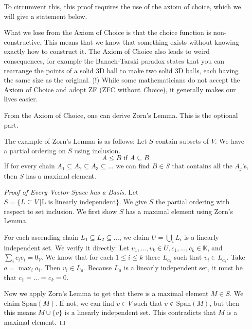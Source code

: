 To circumvent this, this proof requires the use of the axiom of choice, which we will give a statement below.
\begin{remark}
	What we lose from the Axiom of Choice is that the choice function is non-constructive. This means that we know that something exists without knowing
	exactly how to construct it. The Axiom of Choice also leads to weird consequences, for example the Banach-Tarski paradox states that you can
	rearrange the points of a solid 3D ball to make two solid 3D balls, each having the same size as the original. (!)
	While some mathematicians do not accept the Axiom of Choice and adopt ZF (ZFC without \textit{C}hoice), it generally makes our lives easier.
\end{remark}
From the Axiom of Choice, one can derive Zorn's Lemma. This is the optional part.
\begin{remark}
	The example of Zorn's Lemma is as follows:
	Let $S$ contain subsets of $V$. We have a partial ordering on $S$ using inclusion.\[
	A\leq B \textrm{ if } A\subseteq B.
	\] 
	If for every chain $A_1\subseteq A_2 \subseteq A_3\subseteq\ldots$ we can find $B\in S$ that contains all the $A_j$'s, then $S$ has a maximal element.
\end{remark}
\begin{proof}[Proof of Every Vector Space has a Basis]
	Let $S = \{L\subseteq V \ | \textrm {L is linearly independent}\}$. We give $S$ the partial ordering with respect to set inclusion. We first show $S$ has a maximal element using Zorn's Lemma.

	For each ascending chain $L_1\subseteq L_2\subseteq \ldots$, we claim $U=\bigcup_i L_i$ is a linearly independent set.
	We verify it directly: Let $v_1,\ldots, v_k\in U, c_1,\ldots,c_k\in\mathbb{K}$,
	and $\sum_{i} c_i v_i = 0_{V}$.
	We know that for each $1\leq i\leq k$ there $L_{a_i}$ such that $v_i\in L_{a_i}$. Take $a=\max_i a_i$.
	Then $v_i\in L_a$. Because $L_a$ is a linearly independent set, it must be that $c_1=\ldots=c_k=0$.
	
	Now we apply Zorn's Lemma to get that there is a maximal element $M\in S$. We claim $\textrm{Span}(M)$.
	If not, we can find $v\in V$ such that $v\notin\textrm{Span}(M)$, but then this means $M\cup\{v\}$ is a linearly independent set.
	This contradicts that $M$ is a maximal element.
\end{proof}
